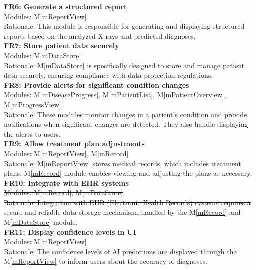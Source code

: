 \documentclass[12pt, titlepage]{article}
\newcommand{\mref}[1]{M\ref{#1}}
\begin{document}
\newline
\textbf{FR6: Generate a structured report} \\
Modules: \mref{mReportView} \\
Rationale: This module is responsible for generating and displaying structured reports based on the analyzed X-rays and predicted diagnoses. \\
\newline
\textbf{FR7: Store patient data securely} \\
Modules: \mref{mDataStore} \\
Rationale: \mref{mDataStore} is specifically designed to store and manage patient data securely, ensuring compliance with data protection regulations. \\
\newline
\textbf{FR8: Provide alerts for significant condition changes} \\
Modules: \mref{mDiseaseProgress}, \mref{mPatientList}, \mref{mPatientOverview}, \mref{mProgressView} \\
Rationale: These modules monitor changes in a patient's condition and provide notifications when significant changes are detected. They also handle displaying the alerts to users. \\
\newline
\textbf{FR9: Allow treatment plan adjustments} \\
Modules: \mref{mReportView}, \mref{mRecord} \\
Rationale: \mref{mReportView} stores medical records, which includes treatment plans. \mref{mRecord} module enables viewing and adjusting the plans as necessary. \\

\noindent\sout{\textbf{FR10: Integrate with EHR systems}} \\
\sout{Modules: \mref{mRecord}, \mref{mDataStore}} \\
\sout{Rationale: Integration with EHR (Electronic Health Records) systems requires a secure and reliable data storage mechanism, handled by the \mref{mRecord} and \mref{mDataStore} module.} \\
\newline
\textbf{FR11: Display confidence levels in UI} \\
Modules: \mref{mReportView} \\
Rationale: The confidence levels of AI predictions are displayed through the \mref{mReportView} to inform users about the accuracy of diagnoses. \\
\end{document}

